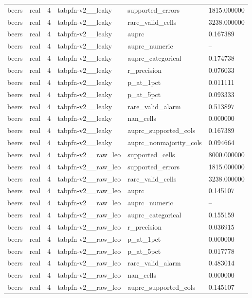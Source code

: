 \begin{tabular}{llllll}
beers & real & 4 & tabpfn-v2\_\_leaky & supported\_errors & 1815.000000 \\
beers & real & 4 & tabpfn-v2\_\_leaky & rare\_valid\_cells & 3238.000000 \\
beers & real & 4 & tabpfn-v2\_\_leaky & auprc & 0.167389 \\
beers & real & 4 & tabpfn-v2\_\_leaky & auprc\_numeric & -- \\
beers & real & 4 & tabpfn-v2\_\_leaky & auprc\_categorical & 0.174738 \\
beers & real & 4 & tabpfn-v2\_\_leaky & r\_precision & 0.076033 \\
beers & real & 4 & tabpfn-v2\_\_leaky & p\_at\_1pct & 0.011111 \\
beers & real & 4 & tabpfn-v2\_\_leaky & p\_at\_5pct & 0.093333 \\
beers & real & 4 & tabpfn-v2\_\_leaky & rare\_valid\_alarm & 0.513897 \\
beers & real & 4 & tabpfn-v2\_\_leaky & nan\_cells & 0.000000 \\
beers & real & 4 & tabpfn-v2\_\_leaky & auprc\_supported\_cols & 0.167389 \\
beers & real & 4 & tabpfn-v2\_\_leaky & auprc\_nonmajority\_cols & 0.094664 \\
beers & real & 4 & tabpfn-v2\_\_raw\_leo & supported\_cells & 8000.000000 \\
beers & real & 4 & tabpfn-v2\_\_raw\_leo & supported\_errors & 1815.000000 \\
beers & real & 4 & tabpfn-v2\_\_raw\_leo & rare\_valid\_cells & 3238.000000 \\
beers & real & 4 & tabpfn-v2\_\_raw\_leo & auprc & 0.145107 \\
beers & real & 4 & tabpfn-v2\_\_raw\_leo & auprc\_numeric & -- \\
beers & real & 4 & tabpfn-v2\_\_raw\_leo & auprc\_categorical & 0.155159 \\
beers & real & 4 & tabpfn-v2\_\_raw\_leo & r\_precision & 0.036915 \\
beers & real & 4 & tabpfn-v2\_\_raw\_leo & p\_at\_1pct & 0.000000 \\
beers & real & 4 & tabpfn-v2\_\_raw\_leo & p\_at\_5pct & 0.017778 \\
beers & real & 4 & tabpfn-v2\_\_raw\_leo & rare\_valid\_alarm & 0.483014 \\
beers & real & 4 & tabpfn-v2\_\_raw\_leo & nan\_cells & 0.000000 \\
beers & real & 4 & tabpfn-v2\_\_raw\_leo & auprc\_supported\_cols & 0.145107 \\

\end{tabular}
